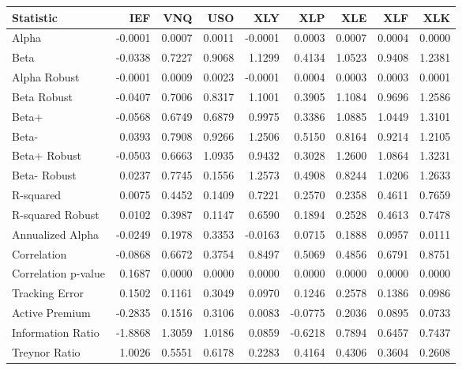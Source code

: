 \begin{tabular}{lrrrrrrrr}
\toprule
Statistic & IEF & VNQ & USO & XLY & XLP & XLE & XLF & XLK \\
\midrule
Alpha & -0.0001 & 0.0007 & 0.0011 & -0.0001 & 0.0003 & 0.0007 & 0.0004 & 0.0000 \\
Beta & -0.0338 & 0.7227 & 0.9068 & 1.1299 & 0.4134 & 1.0523 & 0.9408 & 1.2381 \\
Alpha Robust & -0.0001 & 0.0009 & 0.0023 & -0.0001 & 0.0004 & 0.0003 & 0.0003 & 0.0001 \\
Beta Robust & -0.0407 & 0.7006 & 0.8317 & 1.1001 & 0.3905 & 1.1084 & 0.9696 & 1.2586 \\
Beta+ & -0.0568 & 0.6749 & 0.6879 & 0.9975 & 0.3386 & 1.0885 & 1.0449 & 1.3101 \\
Beta- & 0.0393 & 0.7908 & 0.9266 & 1.2506 & 0.5150 & 0.8164 & 0.9214 & 1.2105 \\
Beta+ Robust & -0.0503 & 0.6663 & 1.0935 & 0.9432 & 0.3028 & 1.2600 & 1.0864 & 1.3231 \\
Beta- Robust & 0.0237 & 0.7745 & 0.1556 & 1.2573 & 0.4908 & 0.8244 & 1.0206 & 1.2633 \\
R-squared & 0.0075 & 0.4452 & 0.1409 & 0.7221 & 0.2570 & 0.2358 & 0.4611 & 0.7659 \\
R-squared Robust & 0.0102 & 0.3987 & 0.1147 & 0.6590 & 0.1894 & 0.2528 & 0.4613 & 0.7478 \\
Annualized Alpha & -0.0249 & 0.1978 & 0.3353 & -0.0163 & 0.0715 & 0.1888 & 0.0957 & 0.0111 \\
Correlation & -0.0868 & 0.6672 & 0.3754 & 0.8497 & 0.5069 & 0.4856 & 0.6791 & 0.8751 \\
Correlation p-value & 0.1687 & 0.0000 & 0.0000 & 0.0000 & 0.0000 & 0.0000 & 0.0000 & 0.0000 \\
Tracking Error & 0.1502 & 0.1161 & 0.3049 & 0.0970 & 0.1246 & 0.2578 & 0.1386 & 0.0986 \\
Active Premium & -0.2835 & 0.1516 & 0.3106 & 0.0083 & -0.0775 & 0.2036 & 0.0895 & 0.0733 \\
Information Ratio & -1.8868 & 1.3059 & 1.0186 & 0.0859 & -0.6218 & 0.7894 & 0.6457 & 0.7437 \\
Treynor Ratio & 1.0026 & 0.5551 & 0.6178 & 0.2283 & 0.4164 & 0.4306 & 0.3604 & 0.2608 \\
\bottomrule
\end{tabular}
